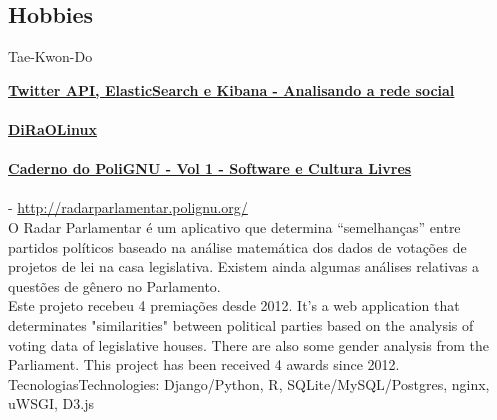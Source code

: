 \documentclass[]{friggeri-cv}
\begin{document}
\begin{aside}
  \section{Hobbies}
      \href{http://olhares.com/diraol}{}
      Tae-Kwon-Do
\end{aside}

\href{http://polignu.org/artigo/twitter-api-elasticsearch-e-kibana-analisando-rede-social}{\textbf{Twitter API, ElasticSearch e Kibana - Analisando a rede social}}\\
\emph{}\\

\href{http://diraol.polignu.org}{\textbf{DiRaOLinux}}\\
\emph{}\\

\href{http://polignu.org/administrativo/caderno-polignu-volume-1-software-e-culturas-livres}{\textbf{Caderno do PoliGNU - Vol 1 - Software e Cultura Livres}}\\
\emph{}\\

\textbf{} - \href{http://radarparlamentar.polignu.org/}{http://radarparlamentar.polignu.org/}\\
%
{O Radar Parlamentar é um aplicativo que determina ``semelhanças'' entre partidos \nohyphens{políticos} baseado na análise matemática dos dados de votações de projetos de lei na casa \nohyphens{legislativa}. Existem ainda algumas análises relativas a questões de gênero no Parlamento.\\
Este projeto recebeu 4 premiações desde 2012.}%
{It's a web application that determinates "similarities" between political parties based on the analysis of voting data of legislative houses. There are also some gender analysis from the Parliament. 
This project has been received 4 awards since 2012.}\\
%
{Tecnologias}{Technologies}: Django/Python, R, SQLite/MySQL/Postgres, nginx, uWSGI, D3.js
\end{document}
